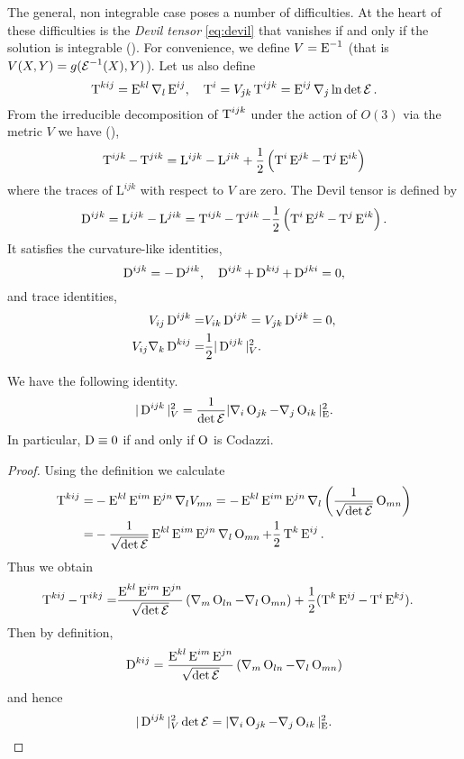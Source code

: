 \documentclass[a4paper,12pt]{amsart}
\begin{document}
The general, non integrable case poses a number of difficulties. At the heart of these difficulties is the \emph{Devil tensor} \eqref{eq:devil} that vanishes if and only if the solution is integrable (). For convenience, we define \(V = \operatorname{E}^{-1}\) (that is \(V(X, Y) = g(\operatorname{\mathcal{E}}^{-1} (X), Y)\)). Let us also define
\begin{equation}
\label{eq:T}
\operatorname{T}^{kij} = \operatorname{E}^{kl}\nabla_l \operatorname{E}^{ij}, \quad \operatorname{T}^i = V_{jk}\operatorname{T}^{ijk} = \operatorname{E}^{ij}\nabla_j \ln\det\operatorname{\mathcal{E}}.
\end{equation}
From the irreducible decomposition of $\operatorname{T}^{ijk}$ under the action of \(O(3)\) via the metric \(V\) we have (\cite[p. 6]{MR2055396}),
\[
\operatorname{T}^{ijk}-\operatorname{T}^{jik} = \mathrm{L}^{ijk}-\mathrm{L}^{jik} + \frac{1}{2}\left(\operatorname{T}^i\operatorname{E}^{jk}-\operatorname{T}^j\operatorname{E}^{ik}\right)
\]
where the traces of $\mathrm{L}^{ijk}$ with respect to $V$ are zero. The Devil tensor is defined by
\begin{equation}
\label{eq:devil}
\operatorname{D}^{ijk}=\mathrm{L}^{ijk}-\mathrm{L}^{jik} = \operatorname{T}^{ijk}-\operatorname{T}^{jik} - \frac{1}{2}\left(\operatorname{T}^i\operatorname{E}^{jk}-\operatorname{T}^j\operatorname{E}^{ik}\right).
\end{equation}
It satisfies the curvature-like identities,
\[
\operatorname{D}^{ijk} = -\operatorname{D}^{jik},\quad \operatorname{D}^{ijk}+\operatorname{D}^{kij}+\operatorname{D}^{jki} = 0,
\]
and trace identities,
\begin{align*}
V_{ij}\operatorname{D}^{ijk}=&V_{ik}\operatorname{D}^{ijk}=V_{jk}\operatorname{D}^{ijk}=0,\\
V_{ij}\nabla_k\operatorname{D}^{kij}=&\frac{1}{2}|\operatorname{D}^{ijk}|_V^2.
\end{align*}

\begin{lemma}
\label{lem:cubicform_codazzi}

We have the following identity.
\[
|\operatorname{D}^{ijk}|_V^2=\frac{1}{\det\operatorname{\mathcal{E}}}|\nabla_i\operatorname{O}_{jk}-\nabla_j\operatorname{O}_{ik}|_{\operatorname{E}}^2.
\]
In particular, \(\operatorname{D}\equiv 0\) if and only if \(\operatorname{O}\) is Codazzi.
\end{lemma}

\begin{proof}
Using the definition we calculate
\begin{align*}
\operatorname{T}^{kij}=&-\operatorname{E}^{kl}\operatorname{E}^{im}\operatorname{E}^{jn}\nabla_l V_{mn} = -\operatorname{E}^{kl}\operatorname{E}^{im}\operatorname{E}^{jn}\nabla_l \left(\frac{1}{\sqrt{\det\operatorname{\mathcal{E}}}} \operatorname{O}_{mn}\right)\\
=&-\frac{1}{\sqrt{\det\operatorname{\mathcal{E}}}}\operatorname{E}^{kl}\operatorname{E}^{im}\operatorname{E}^{jn}\nabla_l \operatorname{O}_{mn}+\frac{1}{2}\operatorname{T}^k\operatorname{E}^{ij}.
\end{align*}
Thus we obtain
\begin{align*}
\operatorname{T}^{kij}-\operatorname{T}^{ikj}=&\frac{\operatorname{E}^{kl}\operatorname{E}^{im}\operatorname{E}^{jn}}{\sqrt{\det\operatorname{\mathcal{E}}}}\left(\nabla_m \operatorname{O}_{ln}-\nabla_l \operatorname{O}_{mn}\right)+\frac{1}{2}(\operatorname{T}^k\operatorname{E}^{ij}-\operatorname{T}^i\operatorname{E}^{kj}).
\end{align*}
Then by definition,
\[
\operatorname{D}^{kij} = \frac{\operatorname{E}^{kl}\operatorname{E}^{im}\operatorname{E}^{jn}}{\sqrt{\det\operatorname{\mathcal{E}}}}\left(\nabla_m \operatorname{O}_{ln}-\nabla_l \operatorname{O}_{mn}\right)
\]
and hence
\[
|\operatorname{D}^{ijk}|_V^2\det\operatorname{\mathcal{E}} = |\nabla_i\operatorname{O}_{jk}-\nabla_j\operatorname{O}_{ik}|_{\operatorname{E}}^2.
\]
\end{proof}
\end{document}
